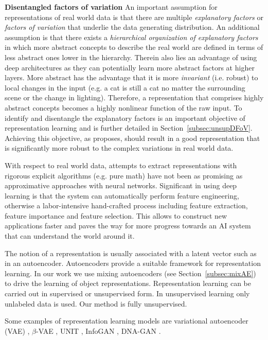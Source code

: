 \documentclass[a4paper,12pt]{report}
\begin{document}
\textbf{Disentangled factors of variation} An important assumption for representations of real world data is that there are multiple \textit{explanatory factors} or \textit{factors of variation} that underlie the data generating distribution. An additional assumption is that there exists a \textit{hierarchical organization of explanatory factors} in which more abstract concepts to describe the real world are defined in terms of less abstract ones lower in the hierarchy. Therein also lies an advantage of using deep architectures as they can potentially learn more abstract factors at higher layers. More abstract has the advantage that it is more \textit{invariant} (i.e. robust) to local changes in the input (e.g. a cat is still a cat no matter the surrounding scene or the change in lighting). Therefore, a representation that comprises highly abstract concepts becomes a highly nonlinear function of the raw input. To identify and disentangle the explanatory factors is an important objective of representation learning and is further detailed in Section~\ref{subsec:unsupDFoV}. Achieving this objective, as \cite{ReprLearning} proposes, should result in a good representation that is significantly more robust to the complex variations in real world data. 

With respect to real world data, attempts to extract representations with rigorous explicit algorithms (e.g. pure math) have not been as promising as approximative approaches with neural networks. Significant in using deep learning is that the system can automatically perform feature engineering, otherwise a labor-intensive hand-crafted process including feature extraction, feature importance and feature selection. This allows to construct new applications faster and paves the way for more progress towards an AI system that can understand the world around it.

The notion of a representation is usually associated with a latent vector such as in an autoencoder. Autoencoders provide a suitable framework for representation learning. In our work we use mixing autoencoders (see Section~\ref{subsec:mixAE}) to drive the learning of object representations. Representation learning can be carried out in supervised or unsupervised form. In unsupervised learning only unlabeled data is used. Our method is fully unsupervised.

Some examples of representation learning models are variational autoencoder (VAE) \cite{VAE}, $\beta$-VAE \cite{betaVAE}, UNIT \cite{UNIT}, InfoGAN \cite{InfoGAN}, DNA-GAN \cite{DnaGan}.
\end{document}
